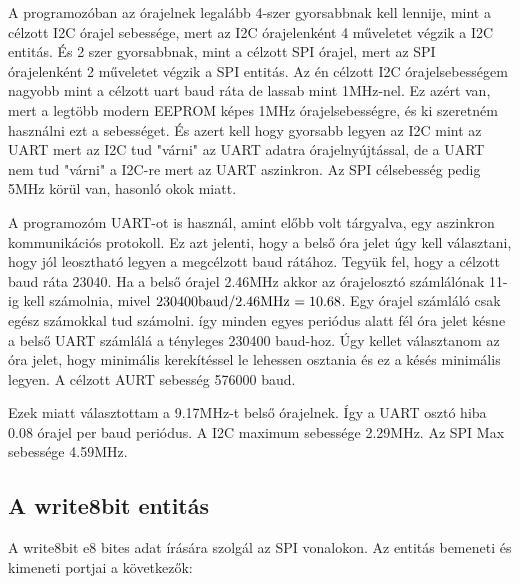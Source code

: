 \documentclass[a4paper,12pt,oneside]{book}
\begin{document}
A programozóban az órajelnek legalább 4-szer gyorsabbnak kell lennije, mint a célzott I2C órajel sebessége, mert az I2C órajelenként 4 műveletet végzik a I2C entitás. És 2 szer gyorsabbnak, mint a célzott SPI órajel, mert az SPI órajelenként 2 műveletet végzik a SPI entitás.
Az én célzott I2C órajelsebességem nagyobb mint a célzott uart baud ráta de lassab mint  1MHz-nel. Ez azért van, mert a legtöbb modern EEPROM képes 1MHz órajelsebességre, és ki szeretném használni ezt a sebességet. És azert kell hogy gyorsabb legyen az I2C mint az UART mert az I2C tud "várni" az UART adatra órajelnyújtással, de a UART nem tud "várni" a I2C-re mert az UART aszinkron. Az SPI célsebesség pedig 5MHz körül van, hasonló okok miatt.

A programozóm UART-ot is használ,  amint előbb volt tárgyalva, egy aszinkron kommunikációs protokoll. Ez azt jelenti, hogy a belső óra jelet úgy kell választani, hogy jól leosztható legyen a megcélzott baud rátához. Tegyük fel, hogy  a célzott baud ráta 23040. Ha a  belső órajel 2.46MHz akkor az órajelosztó számlálónak 11-ig kell számolnia, mivel \(230400$baud$ / 2.46$MHz $ = 10.68\). Egy órajel számláló csak egész számokkal tud számolni. így minden egyes periódus alatt fél óra jelet késne a belső UART számlálá a tényleges 230400 baud-hoz. Úgy kellet választanom az óra jelet, hogy minimális kerekítéssel  le lehessen osztania és ez a késés minimális legyen. A célzott AURT sebesség 576000 baud.

Ezek miatt választottam a 9.17MHz-t belső órajelnek. Így a UART osztó hiba 0.08 órajel per baud periódus. A I2C maximum sebessége 2.29MHz. Az SPI Max sebessége 4.59MHz.

\subsection{A write8bit entitás}
A write8bit e8 bites adat írására szolgál az SPI vonalokon. Az entitás bemeneti és kimeneti portjai a következők:
\end{document}
